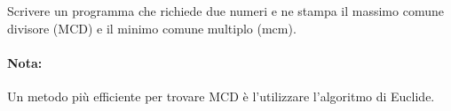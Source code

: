 \begin{Exercise}[label={ex:mcd}]
  Scrivere un programma che richiede due numeri e ne stampa il massimo comune divisore (MCD) e il minimo comune multiplo (mcm).
\end{Exercise}

\begin{Answer}[ref={ex:mcd}]
  
  \paragraph{Nota: } Un metodo più efficiente per trovare MCD è l'utilizzare l'algoritmo di Euclide.
  
\end{Answer}